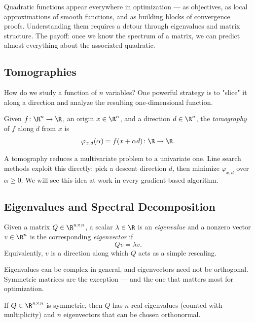 Quadratic functions appear everywhere in optimization — as objectives, as local approximations of smooth functions, and as building blocks of convergence proofs.
Understanding them requires a detour through eigenvalues and matrix structure.
The payoff: once we know the spectrum of a matrix, we can predict almost everything about the associated quadratic.


\subsection{Tomographies}

How do we study a function of $n$ variables?
One powerful strategy is to "slice" it along a direction and analyze the resulting one-dimensional function.

\begin{defn}[Tomography]\label{def:tomography}
  Given $f \colon \R^n \to \R$, an origin $x \in \R^n$, and a direction $d \in \R^n$, the \textit{tomography} of $f$ along $d$ from $x$ is
  $$
    \varphi_{x,d}(\alpha) = f(x + \alpha d) \colon \R \to \R.
  $$
\end{defn}

A tomography reduces a multivariate problem to a univariate one.
Line search methods exploit this directly: pick a descent direction $d$, then minimize $\varphi_{x,d}$ over $\alpha \geq 0$.
We will see this idea at work in every gradient-based algorithm.


\subsection{Eigenvalues and Spectral Decomposition}

\begin{defn}\label{def:eigen}
  Given a matrix $Q \in \R^{n \times n}$, a scalar $\lambda \in \R$ is an \textit{eigenvalue} and a nonzero vector $v \in \R^n$ is the corresponding \textit{eigenvector} if
  $$
    Qv = \lambda v.
  $$
  Equivalently, $v$ is a direction along which $Q$ acts as a simple rescaling.
\end{defn}

Eigenvalues can be complex in general, and eigenvectors need not be orthogonal.
Symmetric matrices are the exception — and the one that matters most for optimization.

\begin{thm}\label{thm:sym-eigen}
  If $Q \in \R^{n \times n}$ is symmetric, then $Q$ has $n$ real eigenvalues (counted with multiplicity) and $n$ eigenvectors that can be chosen orthonormal.
\end{thm}

